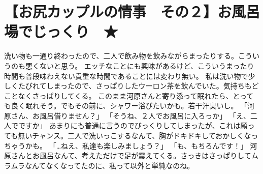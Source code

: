 \section{【お尻カップルの情事　その２】お風呂場でじっくり　★}

洗い物も一通り終わったので、二人で飲み物を飲みながらまったりする。こういうのも悪くないと思う。
エッチなことにも興味があるけど、こういうまったり時間も普段味わえない貴重な時間であることには変わり無い。
私は洗い物で少しくたびれてしまったので、さっぱりしたウーロン茶を飲んでいた。気持ちもどことなくさっぱりしてくる。
このまま河原さんと寄り添って眠れたら、とっても良く眠れそう。でもその前に、シャワー浴びたいかも。若干汗臭いし。
「河原さん、お風呂借りません？」
「そうね、２人でお風呂に入ろっか」
「え、二人でですか」
あまりにも普通に言うのでびっくりしてしまったが、これは願っても無いチャンス。二人で洗いっこするなんて、胸がドキドキしておかしくなっちゃうかも。
「…ねえ、私達も楽しみましょう？」
「も、もちろんです！」
河原さんとお風呂なんて、考えただけで足が震えてくる。さっきはさっぱりしてムラムラなんてなくなってたのに、私って以外と単純なのね。

